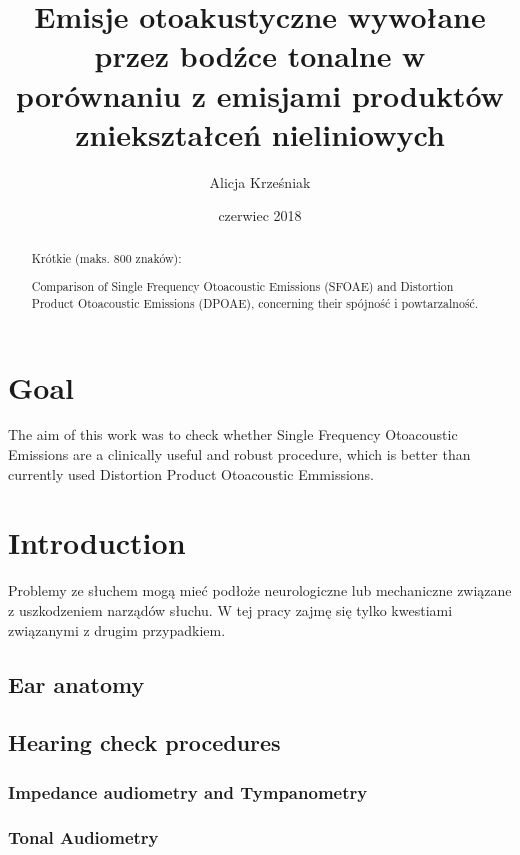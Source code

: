 \documentclass{pracalicmgr}
\author{Alicja Krześniak}
\title{Emisje otoakustyczne wywołane przez bodźce tonalne w porównaniu z emisjami produktów zniekształceń nieliniowych}
\date{czerwiec 2018}
\begin{document}
    \maketitle
    \let\cleardoublepage\clearpage
    
    \begin{abstract}
Krótkie (maks. 800 znaków):

Comparison of Single Frequency Otoacoustic Emissions (SFOAE) and Distortion Product Otoacoustic Emissions (DPOAE), concerning their spójność i powtarzalność. 

     \end{abstract}

  
    \tableofcontents
    
    \chapter*{Goal}
    The aim of this work was to check whether Single Frequency Otoacoustic Emissions are a clinically useful and robust procedure, which is better than currently used Distortion Product Otoacoustic Emmissions.
    
    \chapter{Introduction}
    Problemy ze słuchem mogą mieć podłoże neurologiczne lub mechaniczne związane z uszkodzeniem narządów słuchu. W tej pracy zajmę się tylko kwestiami związanymi z drugim przypadkiem.
    \section{Ear anatomy}
    \section{Hearing check procedures}
    \subsection{Impedance audiometry and Tympanometry}
    \subsection{Tonal Audiometry}
\end{document}
